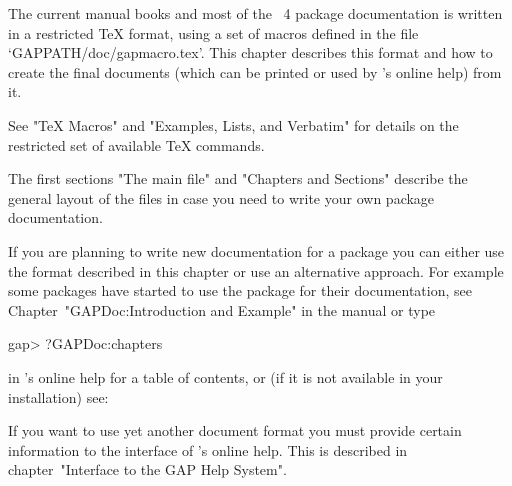 

The  current  {\GAP}  manual  books  and  most  of  the  {\GAP}~4 package
documentation is written in a restricted {\TeX} format, using  a  set  of
macros defined  in  the  file  `GAPPATH/doc/gapmacro.tex'.  This  chapter
describes this format and how to create the final documents (which can be
printed or used by {\GAP}'s online help) from it.

See "TeX Macros" and "Examples, Lists, and Verbatim" for details  on  the
restricted set of available {\TeX} commands.

The first sections "The main file"  and "Chapters and Sections"  describe
the  general  layout of the  files  in case  you need to   write your own
package documentation.

If you are planning to write new documentation for a {\GAP}  package  you
can either use the format described in this chapter or use an alternative
approach.  For  example  some  packages   have   started   to   use   the
   package   for   their    documentation,    see
Chapter~"GAPDoc:Introduction and Example" in the   manual
or type

\beginexample
gap> ?GAPDoc:chapters
\endexample

in {\GAP}'s online help for a  table  of  contents,  or  (if  it  is  not
available in your installation) see:

If you want to use yet another document format you must  provide  certain
information to the interface of {\GAP}'s online help. This  is  described
in chapter~"Interface to the GAP Help System".


